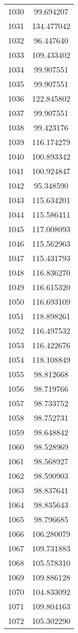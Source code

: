 \documentclass[12pt]{article}
\begin{document}
\begin{longtable}{@{}cc@{}}
1030 & 99.694207 \\
1031 & 134.477042 \\
1032 & 96.447640 \\
1033 & 109.433402 \\
1034 & 99.907551 \\
1035 & 99.907551 \\
1036 & 122.845802 \\
1037 & 99.907551 \\
1038 & 99.423176 \\
1039 & 116.174279 \\
1040 & 100.893342 \\
1041 & 100.924847 \\
1042 & 95.348590 \\
1043 & 115.634201 \\
1044 & 115.586411 \\
1045 & 117.008093 \\
1046 & 115.562963 \\
1047 & 115.431793 \\
1048 & 116.836270 \\
1049 & 116.615320 \\
1050 & 116.693109 \\
1051 & 118.898261 \\
1052 & 116.497532 \\
1053 & 116.422676 \\
1054 & 118.108849 \\
1055 & 98.812668 \\
1056 & 98.719766 \\
1057 & 98.733752 \\
1058 & 98.752731 \\
1059 & 98.648842 \\
1060 & 98.528969 \\
1061 & 98.568927 \\
1062 & 98.590903 \\
1063 & 98.837641 \\
1064 & 98.835643 \\
1065 & 98.796685 \\
1066 & 106.280079 \\
1067 & 109.731883 \\
1068 & 105.578310 \\
1069 & 109.886128 \\
1070 & 104.833092 \\
1071 & 109.804163 \\
1072 & 105.302290 \\

\end{longtable}
\end{document}
